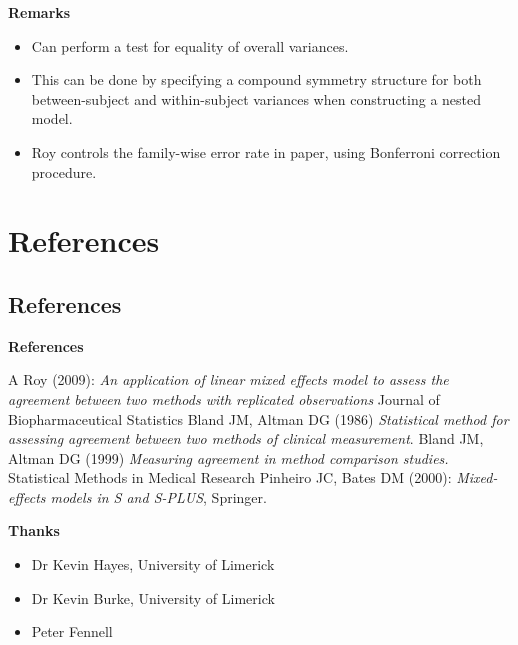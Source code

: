 \documentclass[compress]{beamer}        %
\makeatletter
\newcommand{\tcb}{\textcolor{beamer@blendedblue}}
\makeatother
\begin{document}
		\begin{frame}[fragile]{\bf \tcb{Remarks}}
			\begin{itemize}
				\item Can perform a test for equality of overall variances.\\
				\vspace{0.25cm}\item This can be done by specifying a compound symmetry structure for both between-subject and within-subject variances when constructing a nested model.\\
				\vspace{0.25cm}\item Roy controls the family-wise error rate in paper, using Bonferroni correction procedure.
			\end{itemize}
		\end{frame}
		\section[References]{References}
		\subsection{References}
		\begin{frame}{\bf \tcb{References}}
			\begin{thebibliography}{99}
				 A Roy (2009): \emph{An application of linear mixed effects model to assess the agreement between two methods with replicated observations} Journal of Biopharmaceutical Statistics
				 Bland JM, Altman DG (1986) \emph{Statistical method for assessing agreement between two methods of clinical measurement}.
				 Bland JM, Altman DG (1999)  \emph{Measuring agreement in method comparison studies.} Statistical Methods in Medical Research
				 Pinheiro JC, Bates DM (2000): \emph{Mixed-effects models in S and S-PLUS},
				Springer.
			\end{thebibliography}
		\end{frame}
		
		
		\begin{frame}{\bf \tcb{Thanks}}
			\begin{itemize}
				\item Dr Kevin Hayes, University of Limerick
				\item Dr Kevin Burke, University of Limerick
				\item Peter Fennell
			\end{itemize}
		\end{frame}
		
		
	
\end{document}

